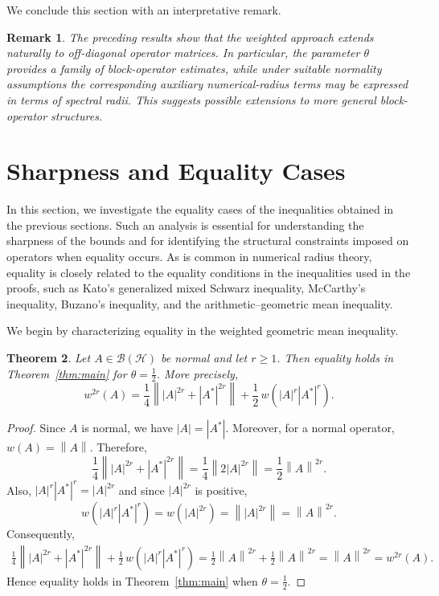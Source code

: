 \documentclass[final,1p,times]{elsarticle}
\newtheorem{thm}{Theorem}[section]
\newtheorem{rem}[thm]{Remark}
\newcommand{\BH}{\mathcal{B}(\mathcal{H})}
\newcommand{\norm}[1]{\left\lVert #1 \right\rVert}
\begin{document}
\medskip

We conclude this section with an interpretative remark.

\begin{rem}
The preceding results show that the weighted approach extends naturally
to off-diagonal operator matrices. In particular, the parameter $\theta$
provides a family of block-operator estimates, while under suitable
normality assumptions the corresponding auxiliary numerical-radius
terms may be expressed in terms of spectral radii. This suggests possible
extensions to more general block-operator structures.
\end{rem}


\section{Sharpness and Equality Cases}

In this section, we investigate the equality cases of the inequalities obtained
in the previous sections.
Such an analysis is essential for understanding the sharpness of the bounds and
for identifying the structural constraints imposed on operators when equality
occurs. As is common in numerical radius theory, equality is closely related
to the equality conditions in the inequalities used in the proofs,
such as Kato's generalized mixed Schwarz inequality, McCarthy's
inequality, Buzano's inequality, and the arithmetic--geometric mean
inequality.

We begin by characterizing equality in the weighted geometric mean inequality.

\medskip

\begin{thm}\label{thm:equality-main}
Let $A\in\BH$ be normal and let $r\geq1$. Then equality holds in
Theorem~\ref{thm:main} for $\theta=\frac12$. More precisely,
\[
w^{2r}(A)
=
\frac14\norm{|A|^{2r}+|A^*|^{2r}}
+
\frac12\,w\!\left(|A|^r|A^*|^r\right).
\]
\end{thm}

\begin{proof}
Since $A$ is normal, we have $|A|=|A^*|.$
Moreover, for a normal operator, $w(A)=\norm{A}.$ Therefore,
\[
\frac14\norm{|A|^{2r}+|A^*|^{2r}}
=
\frac14\norm{2|A|^{2r}}
=
\frac12\norm{A}^{2r}.
\]
Also, $|A|^r|A^*|^r=|A|^{2r}$ and since $|A|^{2r}$ is positive,
\[
w\!\left(|A|^r|A^*|^r\right)
=
w(|A|^{2r})
=
\norm{|A|^{2r}}
=
\norm{A}^{2r}.
\]
Consequently,
\[
\begin{aligned}
\frac14\norm{|A|^{2r}+|A^*|^{2r}}
+
\frac12\,w\!\left(|A|^r|A^*|^r\right)
=
\frac12\norm{A}^{2r}
+
\frac12\norm{A}^{2r}
=
\norm{A}^{2r} =
w^{2r}(A).
\end{aligned}
\]
Hence equality holds in Theorem~\ref{thm:main} when
$\theta=\frac12$.
\end{proof}
\end{document}
